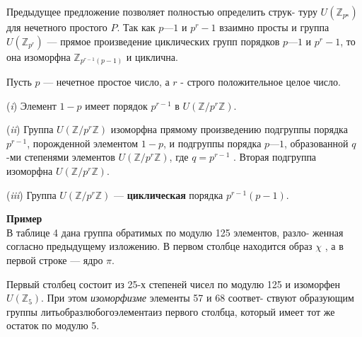 Предыдущее предложение позволяет полностью определить струк­-\linebreak­
туру $U(\mathbb{Z}_{p^к})$ для нечетного простого $P$. Так как $p — 1$ и $p^r - 1$ взаимно\linebreak­
просты и группа $U(\mathbb{Z}_{p^r})$ — прямое произведение циклических групп\linebreak­
порядков $p — 1$ и $p^r - 1$, то она изоморфна $\mathbb{Z}_{p^{r-1}(p-1)}$ и циклична.
\begin{thm}
Пусть $p$ — нечетное простое число, а $r$ - строго положительное целое число.
 
\par  (\textit{i}) Элемент $1 - p$ имеет порядок $p^{r-1}$ в $U(\mathbb{Z}/{p^r}\mathbb{Z})$.
\par  (\textit{ii}) Группа $U(\mathbb{Z}/{p^r}\mathbb{Z})$ изоморфна прямому произведению подгруппы
порядка $p^{r-1}$, порожденной элементом $1-p$, и подгруппы порядка $p — 1$,
образованной $q$-ми степенями элементов $U(\mathbb{Z}/{p^r}\mathbb{Z})$, где $q = p^{r-1}$ . Вторая
подгруппа изоморфна $U(\mathbb{Z}/{p^r}\mathbb{Z})$.
\par  (\textit{iii}) Группа $U(\mathbb{Z}/{p^r}\mathbb{Z})$ --- \textbf{циклическая} порядка $p^{r-1}(p-1)$.
\end{thm}


\noindent\textbf{Пример}
\\

В таблице 4 дана группа обратимых по модулю 125 элементов, разло­-\linebreak­
женная согласно предыдущему изложению. В первом столбце находится\linebreak­
образ $\chi$ , а в первой строке --- ядро $\pi$.

Первый столбец состоит из 25-х степеней чисел по модулю 125 и\linebreak­
изоморфен$U(\mathbb{Z}_5)$. При этом \textit{изоморфизме} элементы 57 и 68 соответ­-\linebreak­
ствуют образующим группы $%
лить образ любого элемента из $%
первого столбца, который имеет тот же остаток по модулю 5.
\newpage
